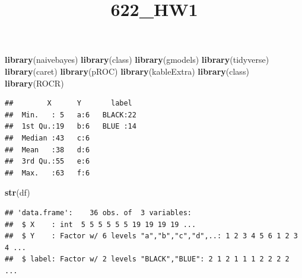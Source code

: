 \documentclass[
]{article}
\title{622\_HW1}
\author{}
\date{\vspace{-2.5em}}
\newenvironment{Shaded}{\begin{snugshade}}{\end{snugshade}}
\newcommand{\DataTypeTok}[1]{\textcolor[rgb]{0.13,0.29,0.53}{#1}}
\newcommand{\KeywordTok}[1]{\textcolor[rgb]{0.13,0.29,0.53}{\textbf{#1}}}
\newcommand{\NormalTok}[1]{#1}
\newcommand{\OperatorTok}[1]{\textcolor[rgb]{0.81,0.36,0.00}{\textbf{#1}}}
\newcommand{\OtherTok}[1]{\textcolor[rgb]{0.56,0.35,0.01}{#1}}
\newcommand{\StringTok}[1]{\textcolor[rgb]{0.31,0.60,0.02}{#1}}
\begin{document}
\maketitle

\begin{Shaded}
\begin{Highlighting}[]
\KeywordTok{library}\NormalTok{(naivebayes)}
\KeywordTok{library}\NormalTok{(class)}
\KeywordTok{library}\NormalTok{(gmodels)}
\KeywordTok{library}\NormalTok{(tidyverse)}
\KeywordTok{library}\NormalTok{(caret)}
\KeywordTok{library}\NormalTok{(pROC)}
\KeywordTok{library}\NormalTok{(kableExtra)}
\KeywordTok{library}\NormalTok{(class)}
\KeywordTok{library}\NormalTok{(ROCR)}
\end{Highlighting}
\end{Shaded}

\begin{Shaded}
\end{Shaded}

\begin{verbatim}
##        X      Y       label   
##  Min.   : 5   a:6   BLACK:22  
##  1st Qu.:19   b:6   BLUE :14  
##  Median :43   c:6             
##  Mean   :38   d:6             
##  3rd Qu.:55   e:6             
##  Max.   :63   f:6
\end{verbatim}

\begin{Shaded}
\begin{Highlighting}[]
\KeywordTok{str}\NormalTok{(df)}
\end{Highlighting}
\end{Shaded}

\begin{verbatim}
## 'data.frame':    36 obs. of  3 variables:
##  $ X    : int  5 5 5 5 5 5 19 19 19 19 ...
##  $ Y    : Factor w/ 6 levels "a","b","c","d",..: 1 2 3 4 5 6 1 2 3 4 ...
##  $ label: Factor w/ 2 levels "BLACK","BLUE": 2 1 2 1 1 1 2 2 2 2 ...
\end{verbatim}
\end{document}
